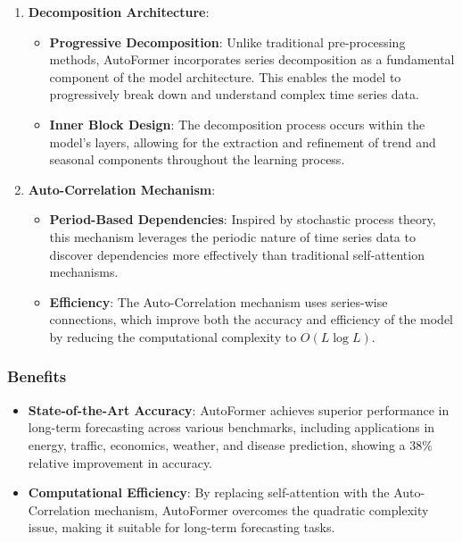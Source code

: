 \documentclass{ieeeojies}
\begin{document}
\begin{enumerate}
    \item \textbf{Decomposition Architecture}:
    \begin{itemize}
        \item \textbf{Progressive Decomposition}: Unlike traditional pre-processing methods, AutoFormer incorporates series decomposition as a fundamental component of the model architecture. This enables the model to progressively break down and understand complex time series data.
        \item \textbf{Inner Block Design}: The decomposition process occurs within the model's layers, allowing for the extraction and refinement of trend and seasonal components throughout the learning process.
    \end{itemize}
    
    \item \textbf{Auto-Correlation Mechanism}:
    \begin{itemize}
        \item \textbf{Period-Based Dependencies}: Inspired by stochastic process theory, this mechanism leverages the periodic nature of time series data to discover dependencies more effectively than traditional self-attention mechanisms.
        \item \textbf{Efficiency}: The Auto-Correlation mechanism uses series-wise connections, which improve both the accuracy and efficiency of the model by reducing the computational complexity to $O(L \log L)$.
    \end{itemize}
\end{enumerate}

\subsubsection*{Benefits}

\begin{itemize}
    \item \textbf{State-of-the-Art Accuracy}: AutoFormer achieves superior performance in long-term forecasting across various benchmarks, including applications in energy, traffic, economics, weather, and disease prediction, showing a 38\% relative improvement in accuracy.
    \item \textbf{Computational Efficiency}: By replacing self-attention with the Auto-Correlation mechanism, AutoFormer overcomes the quadratic complexity issue, making it suitable for long-term forecasting tasks.
\end{itemize}
\end{document}
